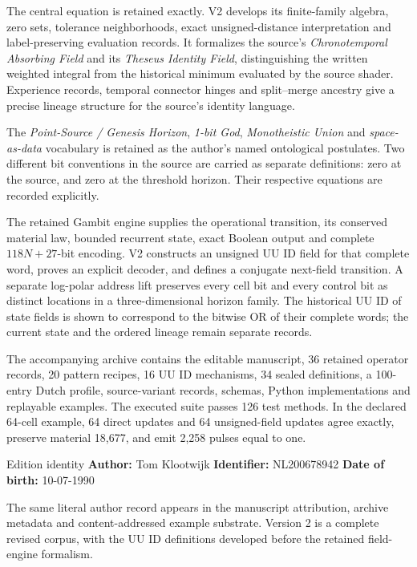 \documentclass[11pt,a4paper]{article}
\numberwithin{equation}{section}
\begin{document}
The central equation is retained exactly. V2 develops its finite-family algebra, zero sets, tolerance neighborhoods, exact unsigned-distance interpretation and label-preserving evaluation records. It formalizes the source's \emph{Chronotemporal Absorbing Field} and its \emph{Theseus Identity Field}, distinguishing the written weighted integral from the historical minimum evaluated by the source shader. Experience records, temporal connector hinges and split--merge ancestry give a precise lineage structure for the source's identity language.

The \emph{Point-Source / Genesis Horizon}, \emph{1-bit God}, \emph{Monotheistic Union} and \emph{space-as-data} vocabulary is retained as the author's named ontological postulates. Two different bit conventions in the source are carried as separate definitions: zero at the source, and zero at the threshold horizon. Their respective equations are recorded explicitly.

The retained Gambit engine supplies the operational transition, its conserved material law, bounded recurrent state, exact Boolean output and complete $118N+27$-bit encoding. V2 constructs an unsigned UU ID field for that complete word, proves an explicit decoder, and defines a conjugate next-field transition. A separate log-polar address lift preserves every cell bit and every control bit as distinct locations in a three-dimensional horizon family. The historical UU ID of state fields is shown to correspond to the bitwise OR of their complete words; the current state and the ordered lineage remain separate records.

The accompanying archive contains the editable manuscript, 36 retained operator records, 20 pattern recipes, 16 UU ID mechanisms, 34 sealed definitions, a 100-entry Dutch profile, source-variant records, schemas, Python implementations and replayable examples. The executed suite passes 126 test methods. In the declared 64-cell example, 64 direct updates and 64 unsigned-field updates agree exactly, preserve material 18,677, and emit 2,258 pulses equal to one.

\begin{statement}{Edition identity}
\textbf{Author:} Tom Klootwijk\qquad
\textbf{Identifier:} NL200678942\qquad
\textbf{Date of birth:} 10-07-1990

The same literal author record appears in the manuscript attribution, archive metadata and content-addressed example substrate. Version 2 is a complete revised corpus, with the UU ID definitions developed before the retained field-engine formalism.
\end{statement}
\end{document}
